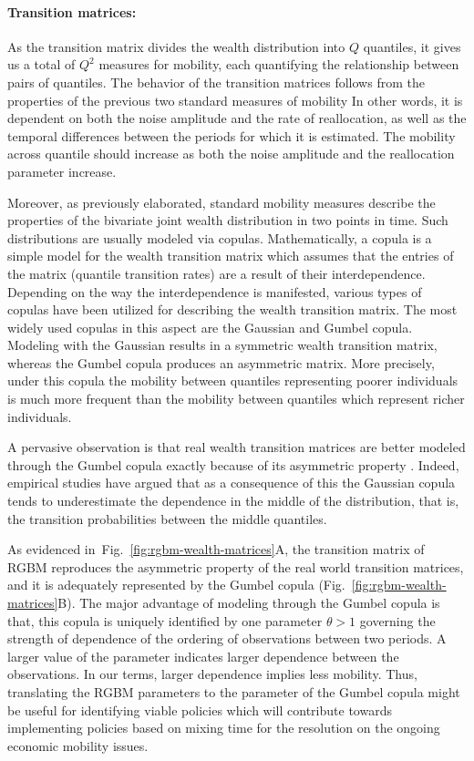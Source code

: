 \documentclass[11pt]{article}
\newcommand{\fref}[1]{Fig.~\ref{fig:#1}}
\numberwithin{equation}{section}
\begin{document}
\paragraph{Transition matrices:} As the transition matrix divides the wealth distribution into $Q$ quantiles, it gives us a total of $Q^2$ measures for mobility, each quantifying the relationship between pairs of quantiles.
The behavior of the transition matrices follows from the properties of the previous two standard measures of mobility In other words, it is dependent on both the noise amplitude and the rate of reallocation, as well as the temporal differences between the periods for which it is estimated. The mobility across quantile should increase as both the noise amplitude and the reallocation parameter increase.

Moreover, as previously elaborated, standard mobility measures describe the properties of the bivariate joint wealth distribution in two points in time. Such distributions are usually modeled via copulas. Mathematically, a copula is a simple model for the wealth transition matrix which assumes that the entries of the matrix (quantile transition rates) are a result of their interdependence. Depending on the way the interdependence is manifested, various types of copulas have been utilized for describing the wealth transition matrix. The most widely used copulas in this aspect are the Gaussian and Gumbel copula. Modeling with the Gaussian results in a symmetric wealth transition matrix, whereas the Gumbel copula produces an asymmetric matrix. More precisely, under this copula the mobility between quantiles representing poorer individuals is much more frequent than the mobility between quantiles which represent richer individuals.

A pervasive observation is that real wealth transition matrices are better modeled through the Gumbel copula exactly because of its asymmetric property \citep{JanttiJenkins2015}. Indeed, empirical studies have argued that as a consequence of this the Gaussian copula tends to underestimate the dependence in the middle of the distribution, that is, the transition probabilities between the middle quantiles. 

As evidenced in~\fref{rgbm-wealth-matrices}A, the transition matrix of RGBM reproduces the asymmetric property of the real world transition matrices, and it is adequately represented by the Gumbel copula (\fref{rgbm-wealth-matrices}B). The major advantage of modeling through the Gumbel copula is that, this copula is uniquely identified by one parameter $\theta>1$ governing the strength of dependence of the ordering of observations between two periods. A larger value of the parameter indicates larger dependence between the observations. In our terms, larger dependence implies less mobility. Thus, translating the RGBM parameters to the parameter of the Gumbel copula might be useful for identifying viable policies which will contribute towards implementing policies based on mixing time for the resolution on the ongoing economic mobility issues.
\end{document}
